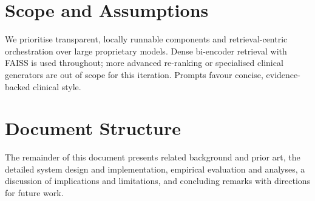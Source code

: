 \section{Scope and Assumptions}
We prioritise transparent, locally runnable components and retrieval-centric orchestration over large proprietary models. Dense bi-encoder retrieval with FAISS is used throughout; more advanced re-ranking or specialised clinical generators are out of scope for this iteration. Prompts favour concise, evidence-backed clinical style.

\section{Document Structure}
The remainder of this document presents related background and prior art, the detailed system design and implementation, empirical evaluation and analyses, a discussion of implications and limitations, and concluding remarks with directions for future work.

